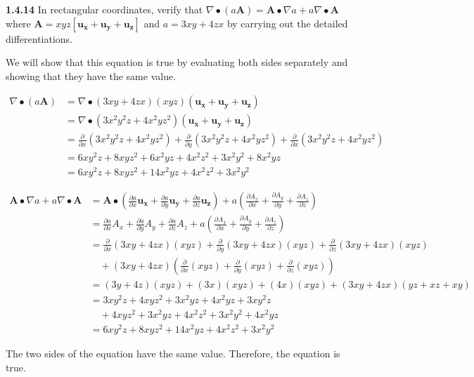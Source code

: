 \documentclass{article}
\begin{document}
\textbf{1.4.14} In rectangular coordinates, verify that $\nabla \bullet (a\mathbf{A}) = \mathbf{A} \bullet \nabla a +
	a\nabla \bullet \mathbf{A}$ where $\mathbf{A} = xyz[\mathbf{u_x} + \mathbf{u_y} + \mathbf{u_z}]$ and $a = 3xy + 4zx$ by
carrying out the detailed differentiations.

\vspace{24pt}

We will show that this equation is true by evaluating both sides separately and showing that they have the same value.

\begin{equation*}
	\begin{split}
		\nabla \bullet (a\mathbf{A}) & = \nabla \bullet (3xy + 4zx)(xyz)(\mathbf{u_x} + \mathbf{u_y} + \mathbf{u_z}) \\
		& = \nabla \bullet (3x^2y^2z + 4x^2yz^2)(\mathbf{u_x} + \mathbf{u_y} + \mathbf{u_z}) \\
		& = \frac{\partial}{\partial x}(3x^2y^2z + 4x^2yz^2) + \frac{\partial}{\partial y}(3x^2y^2z + 4x^2yz^2) + \frac{\partial}{\partial x}(3x^2y^2z + 4x^2yz^2) \\
		& = 6xy^2z + 8xyz^2 + 6x^2yz + 4x^2z^2 + 3x^2y^2 + 8x^2yz \\
		& = 6xy^2z + 8xyz^2 + 14x^2yz + 4x^2z^2 +3x^2y^2
	\end{split}
\end{equation*}

\begin{equation*}
	\begin{split}
		\mathbf{A} \bullet \nabla a + a\nabla \bullet \mathbf{A} & = \mathbf{A} \bullet \left(
		\frac{\partial a}{\partial x}\mathbf{u_x} + \frac{\partial a}{\partial y}\mathbf{u_y} + \frac{\partial a}{\partial z}\mathbf{u_z}
		\right)
		+ a \left(
		\frac{\partial A_x}{\partial x} + \frac{\partial A_y}{\partial y} + \frac{\partial A_z}{\partial z}
		\right) \\
		& = \frac{\partial a}{\partial x}A_x + \frac{\partial a}{\partial y}A_y + \frac{\partial a}{\partial z}A_z
		+ a \left(
		\frac{\partial A_x}{\partial x} + \frac{\partial A_y}{\partial y} + \frac{\partial A_z}{\partial z}
		\right) \\
		& = \frac{\partial}{\partial x}(3xy + 4zx)(xyz) + \frac{\partial}{\partial y}(3xy + 4zx)(xyz) + \frac{\partial}{\partial z}(3xy + 4zx)(xyz) \\
		& \quad + (3xy + 4zx) \left(
		\frac{\partial}{\partial x}(xyz) + \frac{\partial}{\partial y}(xyz) + \frac{\partial}{\partial z}(xyz)
		\right) \\
		& = (3y + 4z)(xyz) + (3x)(xyz) + (4x)(xyz) + (3xy + 4zx)(yz + xz + xy) \\
		& = 3xy^2z + 4xyz^2 + 3x^2yz + 4x^2yz + 3xy^2z \\
		& \quad + 4xyz^2 + 3x^2yz + 4x^2z^2 + 3x^2y^2 + 4x^2yz \\
		& = 6xy^2z + 8xyz^2 + 14x^2yz + 4x^2z^2 + 3x^2y^2
	\end{split}
\end{equation*}

The two sides of the equation have the same value. Therefore, the equation is true.
\end{document}
